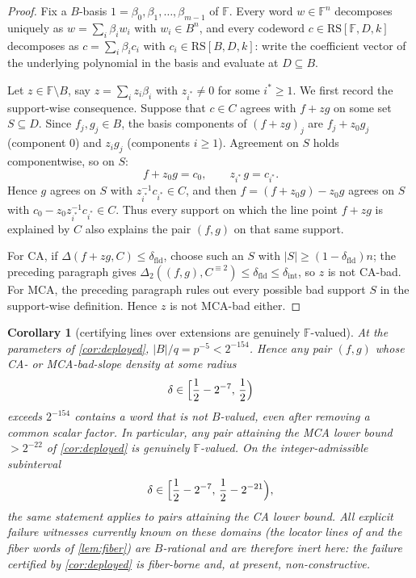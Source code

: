 \documentclass[11pt]{article}
\newtheorem{corollary}[theorem]{Corollary}
\theoremstyle{definition}
\theoremstyle{remark}
\newcommand{\F}{\mathbb{F}}
\newcommand{\B}{B}
\newcommand{\RS}{\mathrm{RS}}
\newcommand{\dist}{\Delta}
\begin{document}
\begin{proof}
Fix a $\B$-basis $1=\beta_0,\beta_1,\dots,\beta_{m-1}$ of $\F$. Every word $w\in\F^n$ decomposes uniquely as $w=\sum_i\beta_i w_i$ with $w_i\in\B^n$, and every codeword $c\in\RS[\F,D,k]$ decomposes as $c=\sum_i\beta_i c_i$ with $c_i\in\RS[\B,D,k]$: write the coefficient vector of the underlying polynomial in the basis and evaluate at $D\subseteq\B$.

Let $z\in\F\setminus\B$, say $z=\sum_iz_i\beta_i$ with $z_{i^*}\ne0$ for some $i^*\ge1$. We first record the support-wise consequence. Suppose that $c\in C$ agrees with $f+zg$ on some set $S\subseteq D$. Since $f_j,g_j\in\B$, the basis components of $(f+zg)_j$ are $f_j+z_0g_j$ (component $0$) and $z_ig_j$ (components $i\ge1$). Agreement on $S$ holds componentwise, so on $S$:
\[
f+z_0g=c_0,\qquad z_{i^*}\,g=c_{i^*}.
\]
Hence $g$ agrees on $S$ with $z_{i^*}^{-1}c_{i^*}\in C$, and then $f=(f+z_0g)-z_0g$ agrees on $S$ with $c_0-z_0z_{i^*}^{-1}c_{i^*}\in C$. Thus every support on which the line point $f+zg$ is explained by $C$ also explains the pair $(f,g)$ on that same support.

For CA, if $\dist(f+zg,C)\le\delta_{\mathrm{fld}}$, choose such an $S$ with $|S|\ge(1-\delta_{\mathrm{fld}})n$; the preceding paragraph gives $\dist_2((f,g),C^{\equiv2})\le\delta_{\mathrm{fld}}\le\delta_{\mathrm{int}}$, so $z$ is not CA-bad. For MCA, the preceding paragraph rules out every possible bad support $S$ in the support-wise definition. Hence $z$ is not MCA-bad either.
\end{proof}

\begin{corollary}[certifying lines over extensions are genuinely $\F$-valued]\label{cor:Fvalued}
At the parameters of \cref{cor:deployed}, $|\B|/q=p^{-5}<2^{-154}$. Hence any pair $(f,g)$ whose CA- or MCA-bad-slope density at some radius
\[
        \delta\in
        \Bigl[\frac12-2^{-7},\,\frac12\Bigr)
\]
exceeds $2^{-154}$ contains a word that is not $\B$-valued, even after removing a common scalar factor. In particular, any pair attaining the MCA lower bound $>2^{-22}$ of \cref{cor:deployed} is genuinely $\F$-valued. On the integer-admissible subinterval
\[
        \delta\in
        \Bigl[\frac12-2^{-7},\,\frac12-2^{-21}\Bigr),
\]
the same statement applies to pairs attaining the CA lower bound. All explicit failure witnesses currently known on these domains (the locator lines of \cite{Cho26a,Cho26b} and the fiber words of \cref{lem:fiber}) are $\B$-rational and are therefore inert here: the failure certified by \cref{cor:deployed} is fiber-borne and, at present, non-constructive.
\end{corollary}
\end{document}
